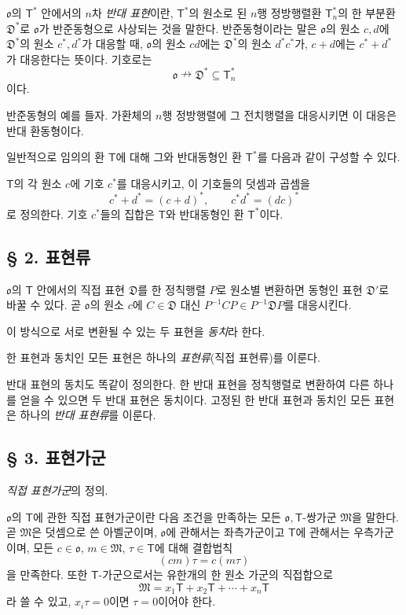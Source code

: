 \(\mathfrak{o}\)의 \(\mathsf T^*\) 안에서의 \(n\)차 \emph{반대 표현}이란, \(\mathsf T^*\)의 원소로 된 \(n\)행 정방행렬환 \(\mathsf T_n^*\)의 한 부분환 \(\mathfrak D^*\)로 \(\mathfrak{o}\)가 반준동형으로 사상되는 것을 말한다. 반준동형이라는 말은 \(\mathfrak{o}\)의 원소 \(c,d\)에 \(\mathfrak D^*\)의 원소 \(c^*,d^*\)가 대응할 때, \(\mathfrak{o}\)의 원소 \(cd\)에는 \(\mathfrak D^*\)의 원소 \(d^*c^*\)가, \(c+d\)에는 \(c^*+d^*\)가 대응한다는 뜻이다. 기호로는
\[
        \mathfrak{o}\nrightarrow\mathfrak D^*
        \subseteq\mathsf T_n^*
\]
이다.

반준동형의 예를 들자. 가환체의 \(n\)행 정방행렬에 그 전치행렬을 대응시키면 이 대응은 반대 환동형이다.

일반적으로 임의의 환 \(\mathsf T\)에 대해 그와 반대동형인 환 \(\mathsf T^*\)를 다음과 같이 구성할 수 있다.

\(\mathsf T\)의 각 원소 \(c\)에 기호 \(c^*\)를 대응시키고, 이 기호들의 덧셈과 곱셈을
\[
        c^*+d^*=(c+d)^*,
        \qquad
        c^*d^*=(dc)^*
\]
로 정의한다. 기호 \(c^*\)들의 집합은 \(\mathsf T\)와 반대동형인 환 \(\mathsf T^*\)이다.

\subsection*{§ 2. 표현류}

\(\mathfrak{o}\)의 \(\mathsf T\) 안에서의 직접 표현 \(\mathfrak D\)를 한 정칙행렬 \(P\)로 원소별 변환하면 동형인 표현 \(\mathfrak D'\)로 바꿀 수 있다. 곧 \(\mathfrak{o}\)의 원소 \(c\)에 \(C\in\mathfrak D\) 대신 \(P^{-1}CP\in P^{-1}\mathfrak D P\)를 대응시킨다.

이 방식으로 서로 변환될 수 있는 두 표현을 \emph{동치}라 한다.

한 표현과 동치인 모든 표현은 하나의 \emph{표현류}(직접 표현류)를 이룬다.

반대 표현의 동치도 똑같이 정의한다. 한 반대 표현을 정칙행렬로 변환하여 다른 하나를 얻을 수 있으면 두 반대 표현은 동치이다. 고정된 한 반대 표현과 동치인 모든 표현은 하나의 \emph{반대 표현류}를 이룬다.

\subsection*{§ 3. 표현가군}

\emph{직접 표현가군}의 정의.

\(\mathfrak{o}\)의 \(\mathsf T\)에 관한 직접 표현가군이란 다음 조건을 만족하는 모든 \(\mathfrak{o},\mathsf T\)-쌍가군 \(\mathfrak M\)을 말한다. 곧 \(\mathfrak M\)은 덧셈으로 쓴 아벨군이며, \(\mathfrak{o}\)에 관해서는 좌측가군이고 \(\mathsf T\)에 관해서는 우측가군이며, 모든 \(c\in\mathfrak{o}\), \(m\in\mathfrak M\), \(\tau\in\mathsf T\)에 대해 결합법칙
\[
        (cm)\tau=c(m\tau)
\]
을 만족한다. 또한 \(\mathsf T\)-가군으로서는 유한개의 한 원소 가군의 직접합으로
\[
        \mathfrak M=x_1\mathsf T+x_2\mathsf T+\cdots+x_n\mathsf T
\]
라 쓸 수 있고, \(x_i\tau=0\)이면 \(\tau=0\)이어야 한다.

